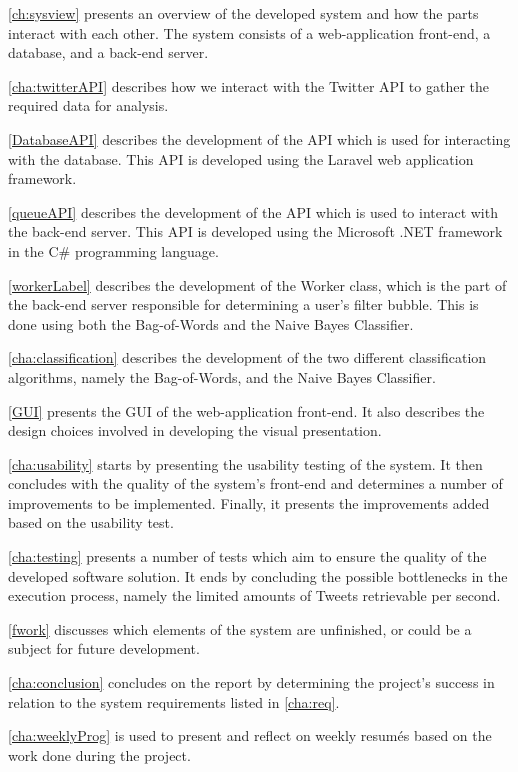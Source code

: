 \autoref{ch:sysview} presents an overview of the developed system and how the
parts interact with each other. The system consists of a web-application
front-end, a database, and a back-end server.\nl

\autoref{cha:twitterAPI} describes how we interact with the Twitter \acs{API} to
gather the required data for analysis.\nl

\autoref{DatabaseAPI} describes the development of the \acs{API} which is used
for interacting with the database. This \acs{API} is developed using the Laravel
web application framework.\nl

\autoref{queueAPI} describes the development of the \acs{API} which is used to
interact with the back-end server. This \acs{API} is developed using the
Microsoft .NET framework in the C\# programming language.\nl

\autoref{workerLabel} describes the development of the Worker class, which is
the part of the back-end server responsible for determining a user's filter
bubble. This is done using both the Bag-of-Words and the Naive Bayes
Classifier.\nl

\autoref{cha:classification} describes the development of the two different
classification algorithms, namely the Bag-of-Words, and the Naive Bayes
Classifier.\nl

\autoref{GUI} presents the \ac{GUI} of the web-application front-end. It also
describes the design choices involved in developing the visual presentation.\nl

\autoref{cha:usability} starts by presenting the usability testing of the
system. It then concludes with the quality of the system's front-end and
determines a number of improvements to be implemented. Finally, it presents
the improvements added based on the usability test.\nl

\autoref{cha:testing} presents a number of tests which aim to ensure the quality
of the developed software solution. It ends by concluding the possible
bottlenecks in the execution process, namely the limited amounts of Tweets
retrievable per second.\nl

\autoref{fwork} discusses which elements of the system are unfinished, or could
be a subject for future development.\nl

\autoref{cha:conclusion} concludes on the report by determining the project's
success in relation to the system requirements listed in \autoref{cha:req}.\nl

\autoref{cha:weeklyProg} is used to present and reflect on weekly resumés based
on the work done during the project.







